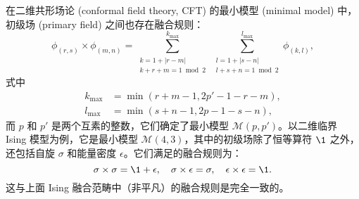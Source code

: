 在二维共形场论 (conformal field theory, CFT) 的最小模型 (minimal model) 中，初级场 (primary field) 之间也存在融合规则\cite{ginsparg1988applied,francesco2012conformal}：
\begin{equation}
  \phi_{(r,s)} \times \phi_{(m,n)}
  = \sum_{\substack{k=1+|r-m| \\ k+r+m=1 \bmod 2}}^{k_{\max}} \,
    \sum_{\substack{l=1+|s-n| \\ l+s+n=1 \bmod 2}}^{l_{\max}} \phi_{(k,l)},
\end{equation}
式中
\begin{equation}
  \begin{aligned}
    k_{\max} &= \min(r+m-1, 2p'-1-r-m), \\
    l_{\max} &= \min(s+n-1, 2p-1-s-n),
  \end{aligned}
\end{equation}
而 $p$ 和 $p'$ 是两个互素的整数，它们确定了最小模型 $\mathcal{M}(p,p')$。以二维临界 Ising 模型为例，它是最小模型 $\mathcal{M}(4,3)$，其中的初级场除了恒等算符 $\1$ 之外，还包括自旋 $\sigma$ 和能量密度 $\epsilon$。它们满足的融合规则为：
\begin{equation}
  \sigma\times\sigma = \1+\epsilon, \quad
  \sigma\times\epsilon = \sigma, \quad
  \epsilon\times\epsilon = \1.
\end{equation}
这与上面 Ising 融合范畴中（非平凡）的融合规则是完全一致的。

